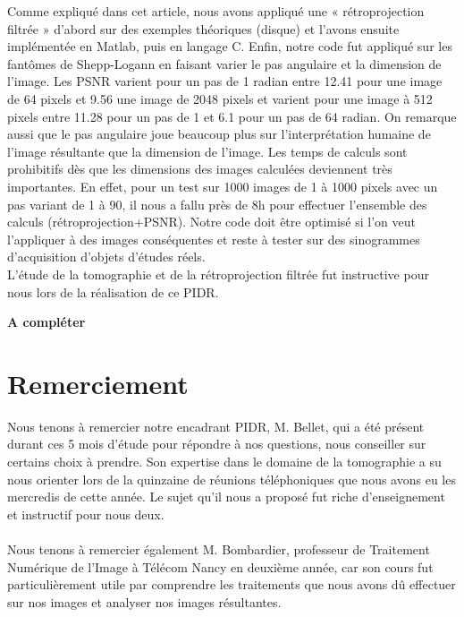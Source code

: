 \documentclass[conference]{IEEEtran}
\begin{document}
Comme expliqué dans cet article, nous avons appliqué une « rétroprojection filtrée » d’abord sur des exemples théoriques (disque) et l’avons ensuite implémentée en Matlab, puis en langage C. Enfin, notre code fut appliqué sur les fantômes de Shepp-Logann en faisant varier le pas angulaire et la dimension de l'image. Les PSNR varient pour un pas de 1 radian entre 12.41 pour une image de 64 pixels et 9.56 une image de 2048 pixels et varient pour une image à 512 pixels entre 11.28 pour un pas de 1 et 6.1 pour un pas de 64 radian. On remarque aussi que le pas angulaire joue beaucoup plus sur l'interprétation humaine de l'image résultante que la dimension de l'image. Les temps de calculs sont prohibitifs dès que les dimensions des images calculées deviennent très importantes. En effet, pour un test sur 1000 images de 1 à 1000 pixels avec un pas variant de 1 à 90, il nous a fallu près de 8h pour effectuer l'ensemble des calculs (rétroprojection+PSNR). Notre code doit être optimisé si l'on veut l'appliquer à des images conséquentes et reste à tester sur des sinogrammes d'acquisition d'objets d'études réels. 
\\
L'étude de la tomographie et de la rétroprojection filtrée fut instructive pour nous lors de la réalisation de ce PIDR.

\textbf{A compléter}






\section*{Remerciement}

Nous tenons à remercier notre encadrant PIDR, M. Bellet, qui a été présent durant ces 5 mois d'étude pour répondre à nos questions, nous conseiller sur certains choix à prendre. Son expertise dans le domaine de la tomographie a su nous orienter lors de la quinzaine de réunions téléphoniques que nous avons eu les mercredis de cette année. Le sujet qu'il nous a proposé fut riche d'enseignement et instructif pour nous deux.
\\
\\
Nous tenons à remercier également M. Bombardier, professeur de Traitement Numérique de l'Image à Télécom Nancy en deuxième année, car son cours fut particulièrement utile par comprendre les traitements que nous avons dû effectuer sur nos images et analyser nos images résultantes.
\end{document}
